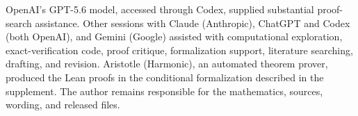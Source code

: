 \documentclass[ECP,preprint]{ejpecp}
\begin{document}
\medskip
\begin{acks}
OpenAI's GPT-5.6 model, accessed through Codex, supplied substantial proof-search
assistance. Other sessions with Claude (Anthropic), ChatGPT and Codex (both
OpenAI), and Gemini (Google) assisted with computational exploration,
exact-verification code, proof critique, formalization support, literature
searching, drafting, and revision. Aristotle (Harmonic), an automated theorem
prover, produced the Lean proofs in the conditional formalization described in
the supplement. The author remains responsible for the mathematics, sources,
wording, and released files.
\end{acks}



\end{document}
